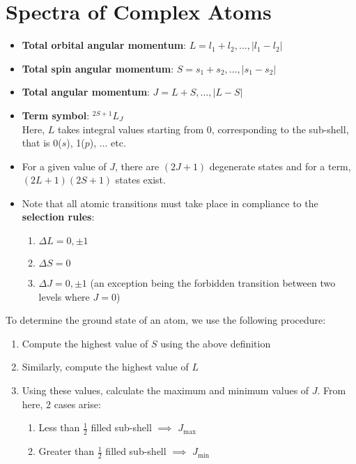 \documentclass[a4paper]{article}
\begin{document}
\section{Spectra of Complex Atoms}
\begin{itemize}
    \item \textbf{Total orbital angular momentum}: $L = l_1+l_2,\dots, |l_1-l_2|$
    \item \textbf{Total spin angular momentum}: $S = s_1+s_2,\dots, |s_1-s_2|$
    \item \textbf{Total angular momentum}: $J = L+S,\dots, |L-S|$
    \item \textbf{Term symbol}: ${}^{2S+1}L_J$\\
    Here, $L$ takes integral values starting from 0, corresponding to the sub-shell, that is 0($s$), 1($p$), $\dots$ etc.
    \item For a given value of $J$, there are $(2J+1)$ degenerate states and for a term, $(2L+1)(2S+1)$ states exist.
    \item Note that all atomic transitions must take place in compliance to the \textbf{selection rules}:
    \begin{enumerate}
        \item $\Delta L = 0, \pm 1$
        \item $\Delta S = 0$
        \item $\Delta J = 0, \pm 1$ (an exception being the forbidden transition between two levels where $J=0$)
    \end{enumerate}
\end{itemize}
To determine the ground state of an atom, we use the following procedure:
\begin{enumerate}
    \item Compute the highest value of $S$ using the above definition
    \item Similarly, compute the highest value of $L$
    \item Using these values, calculate the maximum and minimum values of $J$. From here, 2 cases arise:
    \begin{enumerate}
        \item Less than $\frac{1}{2}$ filled sub-shell $\implies$ $J_{\text{max}}$
        \item Greater than $\frac{1}{2}$ filled sub-shell $\implies$ $J_{\text{min}}$
    \end{enumerate}
\end{enumerate}
\end{document}
